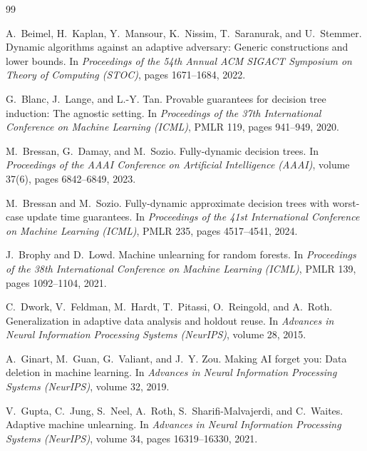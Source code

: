 \documentclass[11pt]{article}
\theoremstyle{definition}
\begin{document}
\begin{thebibliography}{99}

A.~Beimel, H.~Kaplan, Y.~Mansour, K.~Nissim, T.~Saranurak, and U.~Stemmer.
\newblock Dynamic algorithms against an adaptive adversary: Generic constructions and lower bounds.
\newblock In \emph{Proceedings of the 54th Annual ACM SIGACT Symposium on Theory of Computing (STOC)}, pages 1671--1684, 2022.

G.~Blanc, J.~Lange, and L.-Y. Tan.
\newblock Provable guarantees for decision tree induction: The agnostic setting.
\newblock In \emph{Proceedings of the 37th International Conference on Machine Learning (ICML)}, PMLR 119, pages 941--949, 2020.

M.~Bressan, G.~Damay, and M.~Sozio.
\newblock Fully-dynamic decision trees.
\newblock In \emph{Proceedings of the AAAI Conference on Artificial Intelligence (AAAI)}, volume 37(6), pages 6842--6849, 2023.

M.~Bressan and M.~Sozio.
\newblock Fully-dynamic approximate decision trees with worst-case update time guarantees.
\newblock In \emph{Proceedings of the 41st International Conference on Machine Learning (ICML)}, PMLR 235, pages 4517--4541, 2024.

J.~Brophy and D.~Lowd.
\newblock Machine unlearning for random forests.
\newblock In \emph{Proceedings of the 38th International Conference on Machine Learning (ICML)}, PMLR 139, pages 1092--1104, 2021.

C.~Dwork, V.~Feldman, M.~Hardt, T.~Pitassi, O.~Reingold, and A.~Roth.
\newblock Generalization in adaptive data analysis and holdout reuse.
\newblock In \emph{Advances in Neural Information Processing Systems (NeurIPS)}, volume 28, 2015.

A.~Ginart, M.~Guan, G.~Valiant, and J.~Y. Zou.
\newblock Making AI forget you: Data deletion in machine learning.
\newblock In \emph{Advances in Neural Information Processing Systems (NeurIPS)}, volume 32, 2019.

V.~Gupta, C.~Jung, S.~Neel, A.~Roth, S.~Sharifi-Malvajerdi, and C.~Waites.
\newblock Adaptive machine unlearning.
\newblock In \emph{Advances in Neural Information Processing Systems (NeurIPS)}, volume 34, pages 16319--16330, 2021.


\end{thebibliography}
\end{document}
